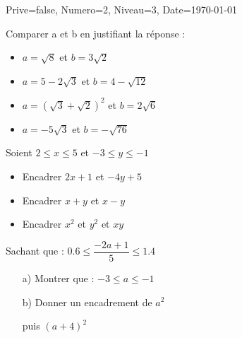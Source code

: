 \documentclass[a4paper,12pt]{article}
\begin{document}
\begin{Maquette}[DM]{Prive=false, Numero=2, Niveau=3, Date=\today}

\begin{exercice}
\begin{enumerate}
\item Comparer a et b en justifiant la réponse :

\begin{minipage}{.5\linewidth}
\begin{itemize}
\item $ a=\sqrt{8}$ et $ b=3\sqrt{2}$
\item $a=5-2\sqrt{3} $ et $  b=4-\sqrt{12}$
\end{itemize}
\end{minipage}
\begin{minipage}{.5\linewidth}
\begin{itemize}
\item $ a=(\sqrt{3}+\sqrt{2})^{2}$ et $ b=2\sqrt{6}$
\item $ a=-5\sqrt{3}$ et $ b=-\sqrt{76}$
\end{itemize}
\end{minipage}
\begin{minipage}{.5\textwidth}
\item Soient $2\leq x\leq 5$ et $-3\leq y\leq -1$
\begin{itemize}
\item Encadrer $2x+1$ et $-4y+5$
\item Encadrer $x+y$ et $x-y$
\item Encadrer $x^{2}$ et $y^{2}$ et $xy$
\end{itemize}
\end{minipage}
\begin{minipage}{.5\textwidth}
\item Sachant que : $0.6\leq \dfrac{-2a+1}{5} \leq 1.4$
\begin{itemize}
\item[a)] Montrer que : $-3\leq a \leq -1$
\item[b)] Donner un encadrement de $a^{2}$

 puis $(a+4)^{2}$
\end{itemize}
\end{minipage}
\end{enumerate}
\end{exercice}


\end{Maquette}
\end{document}
